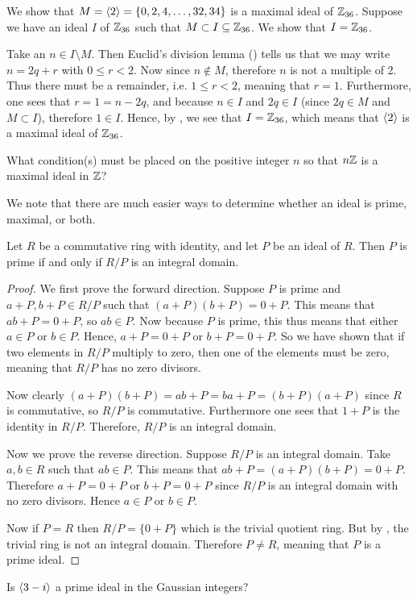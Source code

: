 \begin{example}
    We show that $M = \left\langle2\right\rangle = \{0, 2, 4, \dots, 32, 34\}$ is a maximal ideal of $\mathbb{Z}_{36}$. Suppose we have an ideal $I$ of $\mathbb{Z}_{36}$ such that $M \subset I \subseteq \mathbb{Z}_{36}$. We show that $I = \mathbb{Z}_{36}$.

    Take an $n \in I \setminus M$. Then Euclid's division lemma () tells us that we may write $n = 2q + r$ with $0 \leq r < 2$. Now since $n \notin M$, therefore $n$ is not a multiple of 2. Thus there must be a remainder, i.e. $1 \leq r < 2$, meaning that $r = 1$. Furthermore, one sees that $r = 1 = n - 2q$, and because $n \in I$ and $2q \in I$ (since $2q \in M$ and $M \subset I$), therefore $1 \in I$. Hence, by , we see that $I = \mathbb{Z}_{36}$, which means that $\left\langle2\right\rangle$ is a maximal ideal of $\mathbb{Z}_{36}$.
\end{example}
\begin{exercise}
    What condition(s) must be placed on the positive integer $n$ so that $n\mathbb{Z}$ is a maximal ideal in $\mathbb{Z}$?
\end{exercise}

We note that there are much easier ways to determine whether an ideal is prime, maximal, or both.

\begin{theorem}\label{thrm-prime-ideal-iff-quotient-ring-is-integral-domain}
    Let $R$ be a commutative ring with identity, and let $P$ be an ideal of $R$. Then $P$ is prime if and only if $R/P$ is an integral domain.
\end{theorem}
\begin{proof}
    We first prove the forward direction. Suppose $P$ is prime and $a+P, b+P \in R/P$ such that $(a+P)(b+P) = 0+P$. This means that $ab + P = 0 + P$, so $ab \in P$. Now because $P$ is prime, this thus means that either $a \in P$ or $b \in P$. Hence, $a + P = 0 + P$ or $b + P = 0 + P$. So we have shown that if two elements in $R/P$ multiply to zero, then one of the elements must be zero, meaning that $R/P$ has no zero divisors.

    Now clearly $(a+P)(b+P) = ab + P = ba + P = (b+P)(a+P)$ since $R$ is commutative, so $R/P$ is commutative. Furthermore one sees that $1 + P$ is the identity in $R/P$. Therefore, $R/P$ is an integral domain.

    Now we prove the reverse direction. Suppose $R/P$ is an integral domain. Take $a,b \in R$ such that $ab \in P$. This means that $ab + P = (a+P)(b+P) = 0 + P$. Therefore $a+P = 0 + P$ or $b + P = 0 + P$ since $R/P$ is an integral domain with no zero divisors. Hence $a \in P$ or $b \in P$.

    Now if $P = R$ then $R/P = \{0 + P\}$ which is the trivial quotient ring. But by , the trivial ring is not an integral domain. Therefore $P \neq R$, meaning that $P$ is a prime ideal.
\end{proof}
\begin{exercise}
    Is $\left\langle3 - i\right\rangle$ a prime ideal in the Gaussian integers?
\end{exercise}

